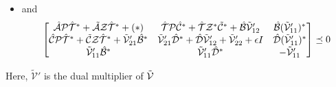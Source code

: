 \begin{theorem}
\begin{itemize}
		\item and
		      \vspace{-2ex}
		      \begin{equation*}
			      \begin{bmatrix}
				      \hat{\mathcal{A}}\mathcal{P}\hat{\mathcal{T}}^* + \tilde{\mathcal{A}}\mathcal{Z}\hat{\mathcal{T}}^* + (*)
				      & \hat{\mathcal{T}}\mathcal{P}\hat{\mathcal{C}}^*
				      + \hat{\mathcal{T}}\mathcal{Z}^*\tilde{\mathcal{C}}^*
				      + \hat{\mathcal{B}}\tilde{\mathcal{V}}'_{12}
				      & \hat{\mathcal{B}}(\tilde{\mathcal{V}}'_{11})^* \\
				      \hat{\mathcal{C}}\mathcal{P}\hat{\mathcal{T}}^* + \tilde{\mathcal{C}}\mathcal{Z}\hat{\mathcal{T}}^* + \tilde{\mathcal{V}}'_{21}\hat{\mathcal{B}}^*
				      & \tilde{\mathcal{V}}'_{21}\hat{\mathcal{D}}^* + \hat{\mathcal{D}}\tilde{\mathcal{V}}'_{12} + \tilde{\mathcal{V}}'_{22} + \epsilon I
				      & \hat{\mathcal{D}}(\tilde{\mathcal{V}}'_{11})^* \\
				      \tilde{\mathcal{V}}'_{11}\hat{\mathcal{B}}^*
				      & \tilde{\mathcal{V}}'_{11}\hat{\mathcal{D}}^*
				      & -\tilde{\mathcal{V}}'_{11}
			      \end{bmatrix}
			      \preceq 0
		      \end{equation*}
	\end{itemize}
	Here, $\tilde{\mathcal{V}}'$ is the dual multiplier of $\tilde{\mathcal{V}}$
\end{theorem}
